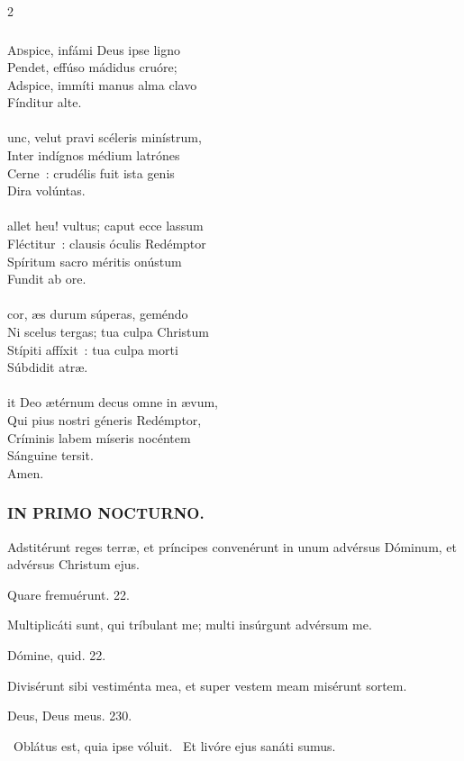 \documentclass[9pt,twoside]{extarticle}
\begin{document}
\begin{multicols}{2}
{{{\subsubsection*{\center{}}
\lettrine{A}dspice, infámi Deus ipse ligno\\
Pendet, effúso mádidus cruóre;\\
Adspice, immíti manus alma clavo\\
Fínditur alte.\\
\\
unc, velut pravi scéleris minístrum,\\
Inter indígnos médium latrónes\\
Cerne~: crudélis fuit ista genis\\
Dira volúntas.\\
\\
allet heu! vultus; caput ecce lassum\\
Fléctitur~: clausis óculis Redémptor\\
Spíritum sacro méritis onústum\\
Fundit ab ore.\\
\\
 cor, æs durum súperas, geméndo\\
Ni scelus tergas; tua culpa Christum\\
Stípiti affíxit~: tua culpa morti\\
Súbdidit atræ.\\
\\
it Deo ætérnum decus omne in ævum,\\
Qui pius nostri géneris Redémptor,\\
Críminis labem míseris nocéntem\\
Sánguine tersit.\\
Amen.

\subsubsection*{\center \textsc{IN PRIMO NOCTURNO.}}
\begin{tightlist}{}
\item {} Adstitérunt reges terræ, et príncipes convenérunt in unum advérsus Dóminum, et advérsus Christum ejus.
\item {} Quare fremuérunt. 22.
\item {} Multiplicáti sunt, qui tríbulant me; multi insúrgunt advérsum me.
\item {} Dómine, quid. 22.
\item {} Divisérunt sibi vestiménta mea, et super vestem meam misérunt sortem.
\item {} Deus, Deus meus. 230.
\item {}~Oblátus est, quia ipse vóluit. ~Et livóre ejus sanáti sumus.
\item {}
\end{tightlist}

}}}
\end{multicols}
\end{document}
